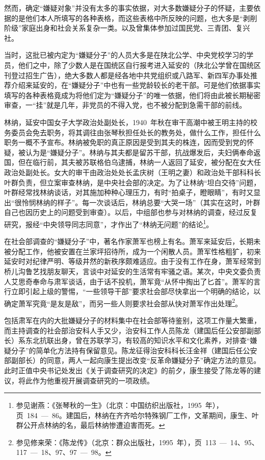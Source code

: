 然而，确定“嫌疑对象”并没有太多的事实依据，对大多数嫌疑分子的怀疑，主要依据的是他们本人所填写的各种表格，而这些表格中所反映的问题，也大多是“剥削阶级”家庭出身和社会关系复杂一类。以及曾集体参加过国民党、三青团、复兴社。

当时，这批已被内定为“嫌疑分子”的人员大多是在陕北公学、中央党校学习的学员，他们之中，除了少数人是在国统区自行报考进入延安的（陕北公学曾在国统区刊登过招生广告），绝大多数人都是经各地中共党组织或八路军、新四军办事处推荐介绍来延安的，在“嫌疑分子”中也有一些党龄较长的老干部。可是他们依据事实填写的各种表格竟成为将他们定为“嫌疑分子”的唯一依据，他们将由此被长期秘密审查，一“挂”就是几年，非党员的不得入党，也不被分配到急需干部的前线。

林纳，延安中国女子大学政治处副处长，1940~年秋在审干高潮中被王明主持的校务委员会免去职务，将其调往由张琴秋担任处长的教务处，做什么工作，担任什么职务一概不予宣布。林纳被免职的真正原因是受到其夫的株连，因而受到党的怀疑，被认为是“嫌疑分子”。林纳与其夫都是留苏干部，抗战爆发后，夫妇俩奉命返国，但在临行前，其夫被苏联格伯乌逮捕，林纳一人返回了延安，被分配在女大任政治处副处长。女大的审干由政治处处长孟庆树（王明之妻）和政治处干部科科长叶群负责，但立案审查林纳，是中央社会部的决定。为了让林纳“坦白交待”问题，叶群经常找林纳谈话，对其施加种种心理压力，有时“拍桌子，瞪眼睛”，有时又显出“很怜悯林纳的样子”。每一次谈话后，林纳总要“大哭一场”（其实在这时，叶群自己也因历史上的问题受到审查）。以后，中组部也参与对林纳的调查，经过反复研究，报经“中央领导同志同意”，才作出了“林纳无问题”的结论\footnote{参见谢燕：《张琴秋的一生》（北京：中国纺织出版社，1995~年），页~184~—~86。建国后，林纳在齐齐哈尔特殊钢厂工作，文革期间，康生、叶群公开点林纳的名，最后林纳惨遭迫害而死。}。

在社会部调查的“嫌疑分子”中，著名作家萧军也榜上有名。萧军来延安后，长期未被分配工作，他被安置在兰家坪招待所，成为一个闲散人员。萧军性格粗犷，初来延安时对纪律严明、等级井然的新秩序颇难适应。由于没有工作在身，萧军经常到桥儿沟鲁艺找朋友聊天，言谈中对延安的生活常有牢骚之语。某次，中央文委负责人艾思奇奉命与肃军谈话，由于话不投机，萧军竟“从怀中掏出了匕首”。萧军的言行立即引起上级的警惕，“一些领导干部”要求社会部尽快拿出一个明确的结论，以确定萧军究竟“是友是敌”，而另一些人则要求社会部从快对萧军作出处理\footnote{参见修来荣：《陈龙传》（北京：群众出版社，1995~年），页~113~—~14、95、117~—~18、97、97~—~98。}。

包括肃军在内的大批嫌疑分子的材料集中在社会部等待鉴别，这项工作量大繁重，而主持调查的社会部治安科人手又少，治安科工作人员陈龙（建国后任公安部副部长）系东北抗联出身，曾在苏联学习，有较高的知识水平和文化素养，对排查“嫌疑分子”的简单化方法持有保留意见。陈龙征得治安科科长汪金祥（建国后任公安部副部长）的同意，两人一起向康生提出改变“反革命嫌疑分子”确定方法的意见。此时正值中央书记处发出《关于调查研究的决定》的前夕，康生接受了陈龙等的建议，将此作为他重视开展调查研究的一项政绩。


